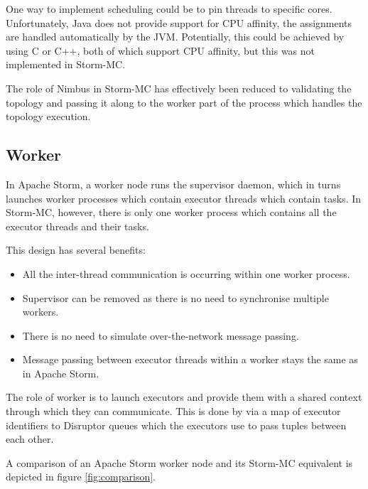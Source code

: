 \documentclass[bsc,logo,frontabs,twoside,singlespacing,normalheadings,parskip]{infthesis}\usepackage[]{graphicx}\usepackage[]{color}
\begin{document}
One way to implement scheduling could be to pin threads to specific cores. Unfortunately, Java does not provide support for CPU affinity, the assignments are handled automatically by the JVM. Potentially, this could be achieved by using C or C++, both of which support CPU affinity, but this was not implemented in Storm-MC.

The role of Nimbus in Storm-MC has effectively been reduced to validating the topology and passing it along to the worker part of the process which handles the topology execution.

\subsection{Worker}

In Apache Storm, a worker node runs the supervisor daemon, which in turns launches worker processes which contain executor threads which contain tasks. In Storm-MC, however, there is only one worker process which contains all the executor threads and their tasks.

This design has several benefits:

\begin{itemize}
	\item All the inter-thread communication is occurring within one worker process.
	\item Supervisor can be removed as there is no need to synchronise multiple workers.
	\item There is no need to simulate over-the-network message passing.
	\item Message passing between executor threads within a worker stays the same as in Apache Storm.
\end{itemize}

The role of worker is to launch executors and provide them with a shared context through which they can communicate. This is done by via a map of executor identifiers to Disruptor queues which the executors use to pass tuples between each other.

A comparison of an Apache Storm worker node and its Storm-MC equivalent is depicted in figure \ref{fig:comparison}.
\end{document}
